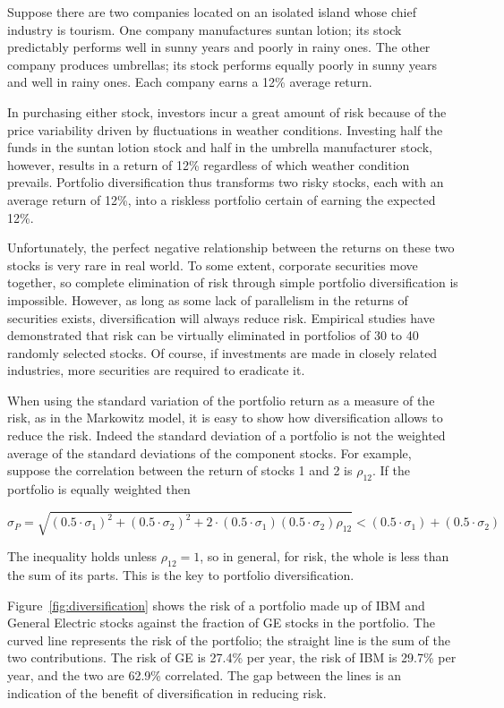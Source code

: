 Suppose there are two companies located on an isolated island whose chief industry is tourism. One company manufactures suntan lotion; its stock predictably performs well in sunny years and poorly in rainy ones. The other company produces umbrellas; its stock performs equally poorly in sunny years and well in rainy ones. Each company earns a 12\% average return.

In purchasing either stock, investors incur a great amount of risk because of the price variability driven by fluctuations in weather conditions. Investing half the funds in the suntan lotion stock and half in the umbrella manufacturer stock, however, results in a return of 12\% regardless of which weather condition prevails. Portfolio diversification thus transforms two risky stocks, each with an average return of 12\%, into a riskless portfolio certain of earning the expected 12\%.

Unfortunately, the perfect negative relationship between the returns on these two stocks is very rare in real world. To some extent, corporate securities move together, so complete elimination of risk through simple portfolio diversification is impossible. However, as long as some lack of parallelism in the returns of securities exists, diversification will always reduce risk.
Empirical studies have demonstrated that risk can be virtually eliminated in portfolios of 30 to 40 randomly selected stocks. Of course, if investments are made in closely related industries, more securities are required to eradicate it.

When using the standard variation of the portfolio return as a measure of the risk, as in the Markowitz model, it is easy to show how diversification allows to reduce the risk. 
Indeed the standard deviation of a portfolio is not the weighted average of the standard deviations of the component stocks.
For example, suppose the correlation between the return of stocks 1 and 2 is $\rho_{12}$. If the portfolio is equally weighted then

\begin{equation}
\sigma_{P} = \sqrt{(0.5\cdot\sigma_1 )^2 + (0.5\cdot\sigma_2 )^2 + 2\cdot(0.5\cdot\sigma_1)(0.5\cdot\sigma_2)\rho_{12}} \lt (0.5\cdot\sigma_1 ) + (0.5\cdot\sigma_2 )
\end{equation}

The inequality holds unless $\rho_{12}=1$, so in general, for risk, the whole is less than the sum of its parts. 
This is the key to portfolio diversification.

Figure~\ref{fig:diversification} shows the risk of a portfolio made up of IBM and General Electric stocks against the fraction of GE stocks in the portfolio. The curved line represents the risk of the portfolio; the straight line is the sum of the two contributions. The risk of GE is 27.4\% per year, the risk of IBM is 29.7\% per year, and the two are 62.9\% correlated. The gap between the lines is an indication of the benefit of diversification in reducing risk.

